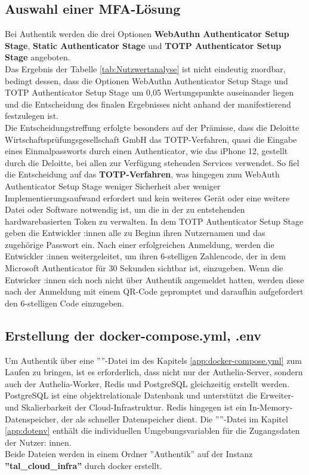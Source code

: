 \subsection{Auswahl einer MFA-Lösung}
\label{sec:Auswahl einer MFA-Lösung}
Bei Authentik werden die drei Optionen \textbf{WebAuthn Authenticator Setup Stage}, \textbf{Static Authenticator Stage} und 
\textbf{\acs{TOTP} Authenticator Setup Stage} angeboten. 
\\Das Ergebnis der Tabelle \ref*{tab:Nutzwertanalyse}  ist nicht eindeutig zuordbar, bedingt dessen, dass 
die Optionen WebAuthn Authenticator Setup Stage und \acs{TOTP} Authenticator Setup Stage um 0,05 Wertungspunkte auseinander liegen und 
die Entscheidung des finalen Ergebnisses nicht anhand der  manifestierend festzulegen ist.
\\Die Entscheidungstreffung erfolgte besonders auf der Prämisse, dass die Deloitte Wirtschaftsprüfungsgesellschaft GmbH das \acs{TOTP}-Verfahren, 
quasi die Eingabe eines Einmalpassworts durch einen Authenticator, wie das iPhone 12, gestellt durch die Deloitte, bei allen zur Verfügung 
stehenden Services verwendet. So fiel die Entscheidung auf das \textbf{\acs{TOTP}-Verfahren}, was hingegen zum WebAuth Authenticator 
Setup Stage weniger Sicherheit aber weniger Implementierungsaufwand erfordert und kein weiteres Gerät oder eine weitere Datei oder Software 
notwendig ist, um die in der zu entstehenden hardwarebasierten Token zu verwalten. In dem \acs{TOTP} Authenticator Setup Stage geben die 
Entwickler :innen alle zu Beginn ihren Nutzernamen und das zugehörige Passwort ein. Nach einer erfolgreichen Anmeldung, werden die 
Entwickler :innen weitergeleitet, um ihren 6-stelligen Zahlencode, der in dem Microsoft Authenticator für 30 Sekunden sichtbar ist, einzugeben. 
Wenn die Entwicker :innen sich noch nicht über Authentik angemeldet hatten, werden diese nach der Anmeldung mit einem QR-Code gepromptet und 
daraufhin aufgefordert den 6-stelligen Code einzugeben.


\subsection{Erstellung der docker-compose.yml, .env}
\label{sec:Erstellung der docker-compose.yml, .env}
Um Authentik über eine ''''-Datei im  des Kapitels \ref{app:docker-compose.yml} 
zum Laufen zu bringen, ist es erforderlich, dass nicht nur der Authelia-Server, sondern auch der Authelia-Worker, 
Redis und PostgreSQL gleichzeitig erstellt werden. PostgreSQL ist eine objektrelationale Datenbank und unterstützt 
die Erweiter- und Skalierbarkeit der Cloud-Infrastruktur. Redis hingegen ist ein In-Memory-Datenspeicher, der als 
schneller Datenspeicher dient. Die ''''-Datei im Kapitel \ref{app:dotenv}  
enthält die individuellen Umgebungsvariablen für die Zugangsdaten der Nutzer: innen. 
\\Beide Dateien werden in einem Ordner ''Authentik'' auf der Instanz \textbf{''tal\_cloud\_infra''} durch docker erstellt.

